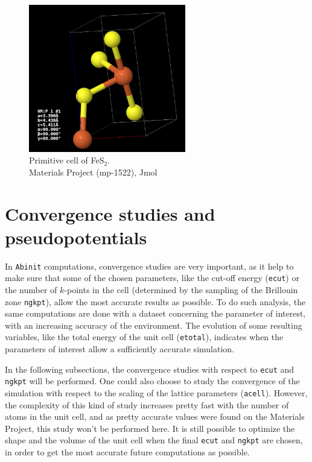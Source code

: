 \documentclass[11pt,a4paper]{article}
\begin{document}
\begin{figure}[H]
\centering
\includegraphics[width=0.61\textwidth]{images/primitiveCell}
\caption{Primitive cell of FeS$_2$.\\Materials Project (mp-1522), Jmol}
\label{fig:primitiveCell}
\end{figure}
\newpage
\section{Convergence studies and pseudopotentials}
In \texttt{Abinit} computations, convergence studies are very important, as it help to make sure that some of the chosen parameters, like the cut-off energy (\texttt{ecut}) or the number of $k$-points in the cell (determined by the sampling of the Brillouin zone \texttt{ngkpt}), allow the most accurate results as possible. To do such analysis, the same computations are done with a dataset concerning the parameter of interest, with an increasing accuracy of the environment. The evolution of some resulting variables, like the total energy of the unit cell (\texttt{etotal}), indicates when the parameters of interest allow a sufficiently accurate simulation.

In the following subsections, the convergence studies with respect to \texttt{ecut} and \texttt{ngkpt} will be performed. One could also choose to study the convergence of the simulation with respect to the scaling of the lattice parameters (\texttt{acell}). However, the complexity of this kind of study increases pretty fast with the number of atoms in the unit cell, and as pretty accurate values were found on the Materials Project, this study won't be performed here. It is still possible to optimize the shape and the volume of the unit cell when the final \texttt{ecut} and \texttt{ngkpt} are chosen, in order to get the most accurate future computations as possible.
\end{document}
